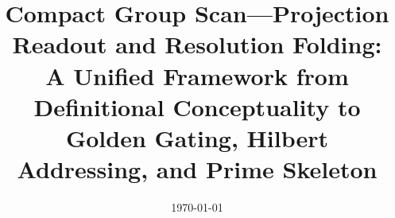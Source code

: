 \documentclass[11pt,letterpaper]{article}
\title{Compact Group Scan—Projection Readout and Resolution Folding: \\\large A Unified Framework from Definitional Conceptuality to Golden Gating, Hilbert Addressing, and Prime Skeleton}
\author{}
\date{\today}
\begin{document}
\maketitle














\FloatBarrier
\appendix





\FloatBarrier

\end{document}
